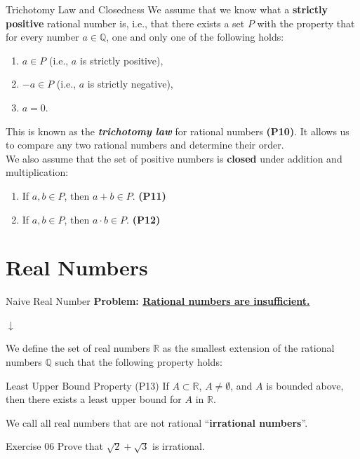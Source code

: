 \documentclass[dvipsnames]{beamer}
\theoremstyle{plain}
\theoremstyle{definition}
\begin{document}
\begin{frame}{Trichotomy Law and Closedness}
    We assume that we know what a \textbf{strictly positive} rational number is, i.e., that there exists a set $P$ with the property that for every number $a \in \mathbb{Q}$, one and only one of the following holds:
    \begin{enumerate}
        \item $a \in P$ (i.e., $a$ is strictly positive),
        \item $-a \in P$ (i.e., $a$ is strictly negative),
        \item $a = 0$.
    \end{enumerate}
    This is known as the \textit{\textbf{trichotomy law}} for rational numbers \textbf{(P10)}. It allows us to compare any two rational numbers and determine their order. \\
    \vspace{0.5cm}
    We also assume that the set of positive numbers is \textbf{closed} under addition and multiplication:
    \begin{enumerate}
        \item If $a,b \in P$, then $a + b \in P$. \textbf{(P11)}
        \item If $a,b \in P$, then $a \cdot b \in P$. \textbf{(P12)}
    \end{enumerate}
\end{frame}
\section{Real Numbers}

\begin{frame}{Naive Real Number}
\textbf{Problem: \underline{Rational numbers are insufficient.}}\\
\vspace{0.2cm}
\begin{centering}
    $\downarrow$ \\
\end{centering}
\vspace{0.2cm}
We define the set of real numbers \( \mathbb{R} \) as the smallest extension of the
rational numbers \( \mathbb{Q} \) such that the following property holds:

\begin{block}{Least Upper Bound Property (P13)}
If \( A \subset \mathbb{R} \), \( A \neq \emptyset \), and \( A \) is bounded above,  
then there exists a least upper bound for \( A \) in \( \mathbb{R} \).
\end{block}

We call all real numbers that are not rational ``\textbf{irrational numbers}''.

\begin{block}{Exercise 06}
    Prove that $\sqrt{2}+\sqrt{3}$ is irrational.
\end{block}
\end{frame}
\end{document}
